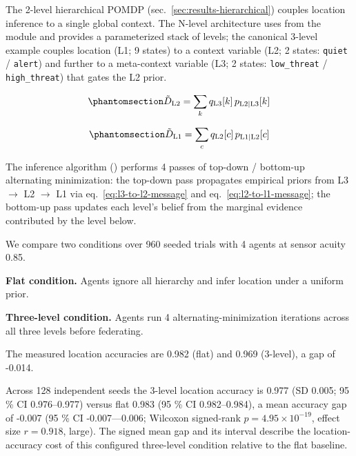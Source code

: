 \documentclass[
  english,
]{article}
\theoremstyle{plain}
\theoremstyle{definition}
\theoremstyle{remark}
\theoremstyle{definition}
\begin{document}
The 2-level hierarchical POMDP (sec.~\ref{sec:results-hierarchical})
couples location inference to a single global context. The N-level
architecture uses  from the
 module and provides a parameterized stack of
levels; the canonical 3-level example couples location (L1; 9 states) to
a context variable (L2; 2 states: \texttt{quiet} / \texttt{alert}) and
further to a meta-context variable (L3; 2 states: \texttt{low\_threat} /
\texttt{high\_threat}) that gates the L2 prior.

\begin{equation}\protect\phantomsection\label{eq:l3-to-l2-message}{\tilde{D}_{\text{L2}} = \sum_k q_{\text{L3}}[k]\,p_{\text{L2|L3}}[k]}\end{equation}

\begin{equation}\protect\phantomsection\label{eq:l2-to-l1-message}{\tilde{D}_{\text{L1}} = \sum_c q_{\text{L2}}[c]\,p_{\text{L1|L2}}[c]}\end{equation}

The inference algorithm ()
performs 4 passes of top-down / bottom-up alternating minimization: the
top-down pass propagates empirical priors from L3 \texorpdfstring{\ensuremath{\to}}{->} L2 \texorpdfstring{\ensuremath{\to}}{->} L1 via
eq.~\ref{eq:l3-to-l2-message} and eq.~\ref{eq:l2-to-l1-message}; the
bottom-up pass updates each level's belief from the marginal evidence
contributed by the level below.

We compare two conditions over 960 seeded trials with 4 agents at sensor
acuity 0.85.

\textbf{Flat condition.} Agents ignore all hierarchy and infer location
under a uniform prior.

\textbf{Three-level condition.} Agents run 4 alternating-minimization
iterations across all three levels before federating.

The measured location accuracies are 0.982 (flat) and 0.969 (3-level), a
gap of -0.014.

Across 128 independent seeds the 3-level location accuracy is 0.977 (SD
0.005; 95 \% CI 0.976--0.977) versus flat 0.983 (95 \% CI 0.982--0.984),
a mean accuracy gap of -0.007 (95 \% CI -0.007---0.006; Wilcoxon
signed-rank \(p = 4.95 \times 10^{-19}\), effect size \(r = 0.918\),
large). The signed mean gap and its interval describe the
location-accuracy cost of this configured three-level condition relative
to the flat baseline.
\end{document}
